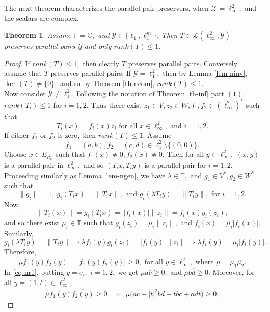 \documentclass{amsart}
\newtheorem{theorem}{Theorem}[section]
\theoremstyle{definition}
\theoremstyle{remark}
\numberwithin{equation}{section}
\begin{document}
 The next theorem characterizes the parallel  pair preservers, when  $\mathcal{X}=\ell_\infty^2,$ and the scalars are complex.
\begin{theorem}\label{th-ncomp}
	Assume $\mathbb{F}=\mathbb{C},$ and $\mathcal{Y}\in\{\ell_1,\ell_1^m\}.$ 
	Then  $T\in\mathcal{L}(\ell_\infty^2, \mathcal{Y})$ preserves parallel pairs if and only $rank(T)\leq 1.$
\end{theorem}
\begin{proof}
	If $rank(T)\leq 1,$ then clearly $T$ preserves parallel pairs. Conversely assume that $T$ preserves parallel pairs. If $\mathcal{Y}=\ell_1^2,$ then by Lemma \ref{lem-ninv}, $\ker(T)\neq\{0\},$ and so  by Theorem \ref{th-ncom}, $rank(T)\leq 1.$ \\
	Now consider $\mathcal{Y}\neq \ell_1^2.$  Following the notation of Theorem \ref{th-inf} part $(1)$, $rank(T_i)\leq 1$ for $i=1,2.$ Thus   there exist $z_1\in V,z_2\in W, f_1,f_2\in (\ell_\infty^2)^*$ such that $$T_i(x)=f_i(x)z_i \text{ for all }x\in \ell_\infty^2, \text{ and }i=1,2.$$ If either $f_1$ or $f_2$ is zero, then $rank(T)\leq 1.$ Assume 
	\[f_1=(a,b), f_2=(c,d)\in \ell_1^2\setminus\{(0,0)\}.\]
	Choose $x\in E_{\ell_\infty^2}$ such that $f_1(x)\neq 0, f_2(x)\neq 0.$ Then for all $y\in \ell_\infty^2,$  $(x,y)$ is a parallel pair in $\ell_\infty^2,$ and so $(T_ix,T_iy)$ is a parallel pair %
	for $i=1,2.$ Proceeding similarly as Lemma \ref{lem-ngen}, we have $\lambda\in \mathbb{T},$ and $g_1\in V^*, g_2\in W^*$ such that 
	\[\|g_i\|=1,~g_i(T_ix)=\|T_ix\|, \text{ and } g_i(\lambda T_iy)=\|T_iy\|, \text{ for } i=1,2.\] Now, 
	\[\|T_i(x)\|=g_i(T_ix)\Rightarrow |f_i(x)|\|z_i\|=f_i(x)g_i(z_i),\]
	and so there exist $\mu_i\in \mathbb{T}$ such that $g_i(z_i)=\mu_i\|z_i\|,$ and $f_i(x)=\overline{\mu_i}|f_i(x)|.$
	Similarly, $$ g_i(\lambda T_iy)=\|T_iy\|\Rightarrow \lambda f_i(y)g_i(z_i)=|f_i(y)|\|z_i\|\Rightarrow \lambda f_i(y)=\overline{\mu_i}|f_i(y)|.$$ Therefore, 
	\begin{equation}\label{eq-nr1}
		\mu f_1(y)\overline{f_2(y)}=|f_1(y)f_2(y)|\geq 0, \text{ for all } y\in \ell_\infty^2, \text{ where } \mu=\mu_1\overline{\mu_2}. 
	\end{equation}
In \eqref{eq-nr1}, putting $y=e_i,$ $i=1,2,$ we get $\mu a\overline{c}\geq 0,$ and $\mu b\overline{d}\geq0.$
Moreover, for all $y=(1,t)\in \ell_\infty^2,$
\begin{eqnarray*}
	\mu f_1(y)\overline{f_2(y)}\geq 0 &\Rightarrow & \mu\Big(a\overline{c}+|t|^2b\overline{d}+tb\overline{c}+a\overline{dt}\Big)\geq0,

\end{eqnarray*}
\end{proof}
\end{document}

